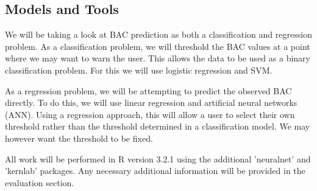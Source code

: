 \subsection{Models and Tools}

We will be taking a look at BAC prediction as both a classification and regression problem. As a classification problem, we will threshold the BAC values at a point where we may want to warn the user. This allows the data to be used as a binary classification problem. For this we will use logistic regression and SVM. 

As a regression problem, we will be attempting to predict the observed BAC directly. To do this, we will use linear regression and artificial neural networks (ANN). Using a regression approach, this will allow a user to select their own threshold rather than the threshold determined in a classification model. We may however want the threshold to be fixed.

All work will be performed in R version 3.2.1 using the additional 'neuralnet' and 'kernlab' packages. Any necessary additional information will be provided in the evaluation section.